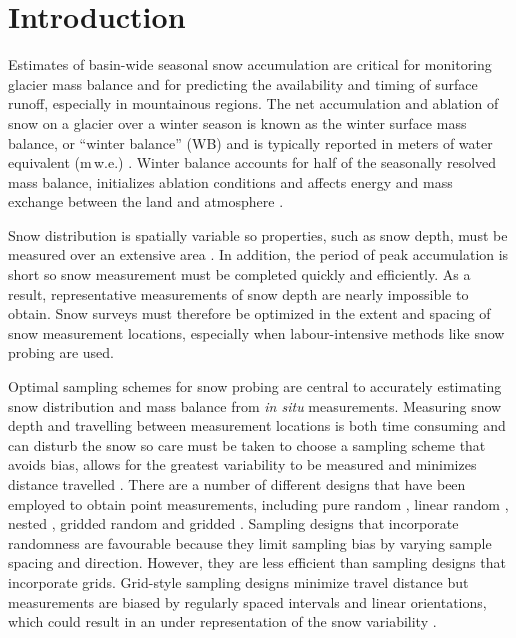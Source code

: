 \documentclass[twocolumn,letterpaper]{igs}
\begin{document}
\maketitle

\section{Introduction}

Estimates of basin-wide seasonal snow accumulation are critical for monitoring glacier mass balance and for predicting the availability and timing of surface runoff, especially in mountainous regions. The net accumulation and ablation of snow on a glacier over a winter season is known as the winter surface mass balance, or ``winter balance'' (WB) and is typically reported in meters of water equivalent (m\,w.e.) \citep{Cogley2011}. Winter balance accounts for half of the seasonally resolved mass balance, initializes ablation conditions and affects energy and mass exchange between the land and atmosphere \citep[e.g.][]{Hock2005, Reveillet2016}. 

Snow distribution is spatially variable so properties, such as snow depth, must be measured over an extensive area \citep[e.g.][]{Kinar2015}. In addition, the period of peak accumulation is short so snow measurement must be completed quickly and efficiently. As a result, representative measurements of snow depth are nearly impossible to obtain. Snow surveys must therefore be optimized in the extent and spacing of snow measurement locations, especially when labour-intensive methods like snow probing are used. 

Optimal sampling schemes for snow probing are central to accurately estimating snow distribution and mass balance from \textit{in situ} measurements. Measuring snow depth and travelling between measurement locations is both time consuming and can disturb the snow so care must be taken to choose a sampling scheme that avoids bias, allows for the greatest variability to be measured and minimizes distance travelled \citep{Shea2010}. There are a number of different designs that have been employed to obtain point measurements, including pure random \citep[e.g.][]{Elder1991}, linear random \cite[e.g.][]{Shea2010}, nested \citep[e.g.][]{Schweizer2008}, gridded random \citep[e.g.][]{Bellaire2008, Elder2009, Bellaire2011} and gridded \citep[e.g.][]{Molotch2005a, Kronholm2007, Lopez2011}. Sampling designs that incorporate randomness are favourable because they limit sampling bias by varying sample spacing and direction. However, they are less efficient than sampling designs that incorporate grids. Grid-style sampling designs minimize travel distance but measurements are biased by regularly spaced intervals and linear orientations, which could result in an under representation of the snow variability \citep{Kronholm2007}.
\end{document}

